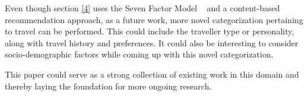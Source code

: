 Even though section \ref{4} uses the Seven Factor Model ~\cite{sertkan2018mapping} and a content-based recommendation approach, as a future work, more novel categorization pertaining to travel can be performed. This could include the traveller type or personality, along with travel history and preferences. It could also be interesting to consider socio-demographic factors while coming up with this novel categorization.

This paper could serve as a strong collection of existing work in this domain and thereby laying the foundation for more ongoing research.



